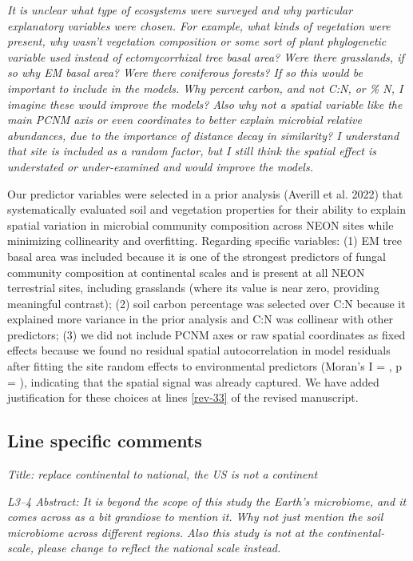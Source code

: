 \documentclass[11pt]{article}
\begin{document}
\bigskip

\textit{It is unclear what type of ecosystems were surveyed and why particular explanatory variables were chosen. For example, what kinds of vegetation were present, why wasn't vegetation composition or some sort of plant phylogenetic variable used instead of ectomycorrhizal tree basal area? Were there grasslands, if so why EM basal area? Were there coniferous forests? If so this would be important to include in the models. Why percent carbon, and not C:N, or \% N, I imagine these would improve the models? Also why not a spatial variable like the main PCNM axis or even coordinates to better explain microbial relative abundances, due to the importance of distance decay in similarity? I understand that site is included as a random factor, but I still think the spatial effect is understated or under-examined and would improve the models.}

Our predictor variables were selected in a prior analysis (Averill et al. 2022) that systematically evaluated soil and vegetation properties for their ability to explain spatial variation in microbial community composition across NEON sites while minimizing collinearity and overfitting. Regarding specific variables: (1) EM tree basal area was included because it is one of the strongest predictors of fungal community composition at continental scales and is present at all NEON terrestrial sites, including grasslands (where its value is near zero, providing meaningful contrast); (2) soil carbon percentage was selected over C:N because it explained more variance in the prior analysis and C:N was collinear with other predictors; (3) we did not include PCNM axes or raw spatial coordinates as fixed effects because we found no residual spatial autocorrelation in model residuals after fitting the site random effects to environmental predictors (Moran's I = %
, p = %
), indicating that the spatial signal was already captured. We have added justification for these choices at lines \ref{rev-33} of the revised manuscript.

\subsection*{Line specific comments}

\textit{Title: replace continental to national, the US is not a continent}

\textit{L3--4 Abstract: It is beyond the scope of this study the Earth's microbiome, and it comes across as a bit grandiose to mention it. Why not just mention the soil microbiome across different regions. Also this study is not at the continental-scale, please change to reflect the national scale instead.}
\end{document}
